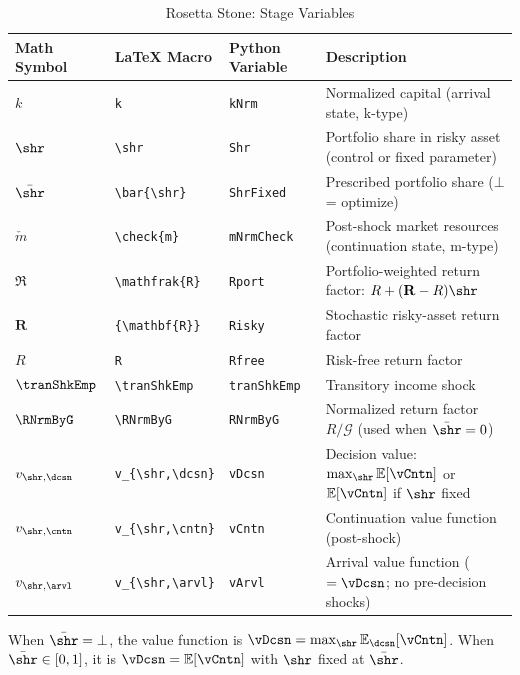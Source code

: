 \documentclass[titlepage, headings=optiontotocandhead]{econark}
\begin{document}
\begin{table}[h]
\caption{Rosetta Stone:  Stage Variables}
\label{tab:rosetta-portable}
\begin{center}
\begin{tabular}{l|l|l|l}
Math Symbol & \LaTeX{} Macro & Python Variable & Description \\
\hline
$k$             & \verb|k|             & \texttt{kNrm}        & Normalized capital (arrival state, k-type) \\
$\shr$              & \verb|\shr|              & \texttt{Shr}         & Portfolio share in risky asset (control or fixed parameter) \\
$\bar{\shr}$        & \verb|\bar{\shr}|        & \texttt{ShrFixed}    & Prescribed portfolio share ($\bot$ = optimize) \\
$\check{m}$     & \verb|\check{m}|     & \texttt{mNrmCheck}   & Post-shock market resources (continuation state, m-type) \\
$\mathfrak{R}$            & \verb|\mathfrak{R}|            & \texttt{Rport}       & Portfolio-weighted return factor: $R + ({\mathbf{R}} - R)\shr$ \\
${\mathbf{R}}$            & \verb|{\mathbf{R}}|            & \texttt{Risky}       & Stochastic risky-asset return factor \\
$R$            & \verb|R|            & \texttt{Rfree}       & Risk-free return factor \\
$\tranShkEmp$       & \verb|\tranShkEmp|       & \texttt{tranShkEmp}  & Transitory income shock \\
$\RNrmByG$          & \verb|\RNrmByG|          & \texttt{RNrmByG}     & Normalized return factor $R / \mathcal{G}$ (used when $\bar{\shr}=0$) \\
$v_{\shr,\dcsn}$ & \verb|v_{\shr,\dcsn}| & \texttt{vDcsn}  & Decision value: $\max_{\shr} {\mathbb{E}}[\vCntn]$ or ${\mathbb{E}}[\vCntn]$ if $\shr$ fixed \\
$v_{\shr,\cntn}$ & \verb|v_{\shr,\cntn}| & \texttt{vCntn}  & Continuation value function (post-shock) \\
$v_{\shr,\arvl}$ & \verb|v_{\shr,\arvl}| & \texttt{vArvl}  & Arrival value function ($= \vDcsn$; no pre-decision shocks) \\
\hline
\end{tabular}
\end{center}
\end{table}

\noindent When $\bar{\shr} = \bot$, the {\Decision} value function is $\vDcsn = \max_{\shr} {\mathbb{E}}_{\dcsn}[\vCntn]$.  When $\bar{\shr} \in [0,1]$, it is $\vDcsn = {\mathbb{E}}[\vCntn]$ with $\shr$ fixed at $\bar{\shr}$.
\end{document}
